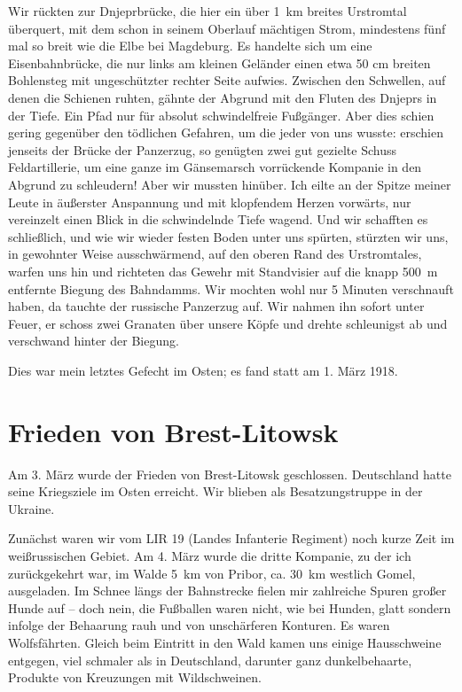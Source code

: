 Wir rückten zur Dnjeprbrücke, die hier ein über 1~km breites Urstromtal überquert, mit dem schon in seinem Oberlauf mächtigen Strom, mindestens fünf mal so breit wie die Elbe bei Magdeburg. Es handelte sich um eine Eisenbahnbrücke, die nur links am kleinen Geländer einen etwa 50 cm breiten Bohlensteg mit ungeschützter rechter Seite aufwies. Zwischen den Schwellen, auf denen die Schienen ruhten, gähnte der Abgrund mit den Fluten des Dnjeprs in der Tiefe. Ein Pfad nur für absolut schwindelfreie Fußgänger. Aber dies schien gering gegenüber den tödlichen Gefahren, um die jeder von uns wusste: erschien jenseits der Brücke der Panzerzug, so genügten zwei gut gezielte Schuss Feldartillerie, um eine ganze im Gänsemarsch vorrückende Kompanie in den Abgrund zu schleudern! Aber wir mussten hinüber. Ich eilte an der Spitze meiner Leute in äußerster Anspannung und mit klopfendem Herzen vorwärts, nur vereinzelt einen Blick in die schwindelnde Tiefe wagend. Und wir schafften es schließlich, und wie wir wieder festen Boden unter uns spürten, stürzten wir uns, in gewohnter Weise ausschwärmend, auf den oberen Rand des Urstromtales, warfen uns hin und richteten das Gewehr mit Standvisier auf die knapp 500~m entfernte Biegung des Bahndamms. Wir mochten wohl nur 5 Minuten verschnauft haben, da tauchte der russische Panzerzug auf. Wir nahmen ihn sofort unter Feuer, er schoss zwei Granaten über unsere Köpfe und drehte schleunigst ab und verschwand hinter der Biegung.

Dies war mein letztes Gefecht im Osten; es fand statt am 1. März 1918.

\section{Frieden von Brest-Litowsk}
Am 3. März wurde der Frieden von Brest-Litowsk geschlossen. Deutschland hatte seine Kriegsziele im Osten erreicht. Wir blieben als Besatzungstruppe in der Ukraine.

Zunächst waren wir vom LIR 19 (Landes Infanterie Regiment) noch kurze Zeit im weißrussischen Gebiet. Am 4. März wurde die dritte Kompanie, zu der ich zurückgekehrt war, im Walde 5~km von Pribor, ca. 30~km westlich Gomel, ausgeladen. Im Schnee längs der Bahnstrecke fielen mir zahlreiche Spuren großer Hunde auf -- doch nein, die Fußballen waren nicht, wie bei Hunden, glatt sondern infolge der Behaarung rauh und von unschärferen Konturen. Es waren Wolfsfährten. Gleich beim Eintritt in den Wald kamen uns einige Hausschweine entgegen, viel schmaler als in Deutschland, darunter ganz dunkelbehaarte, Produkte von Kreuzungen mit Wildschweinen.

